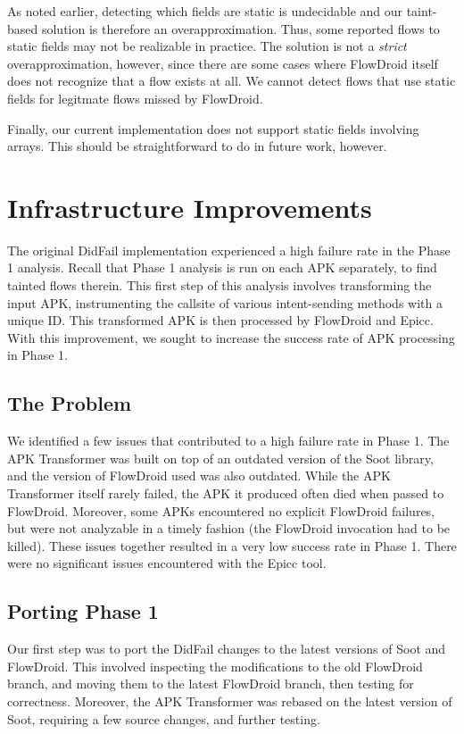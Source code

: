 As noted earlier, detecting which fields are static is undecidable and our taint-based solution is therefore an overapproximation. Thus, some reported flows to static fields may not be realizable in practice. The solution is not a \emph{strict} overapproximation, however, since there are some cases where FlowDroid itself does not recognize that a flow exists at all. We cannot detect flows that use static fields for legitmate flows missed by FlowDroid. 

Finally, our current implementation does not support static fields involving arrays. This should be straightforward to do in future work, however.


\chapter{Infrastructure Improvements}
\label{sec:infrastructure}
The original DidFail implementation experienced a high failure rate in the Phase 1 analysis.  Recall that Phase 1 analysis is run on each APK separately, to find tainted flows therein.  This first step of this analysis involves transforming the input APK, instrumenting the callsite of various intent-sending methods with a unique ID.  This transformed APK is then processed by FlowDroid and Epicc.  With this improvement, we sought to increase the success rate of APK processing in Phase 1.

\section{The Problem}
We identified a few issues that contributed to a high failure rate in Phase 1.  The APK Transformer was built on top of an outdated version of the Soot library, and the version of FlowDroid used was also outdated.  While the APK Transformer itself rarely failed, the APK it produced often died when passed to FlowDroid.  Moreover, some APKs encountered no explicit FlowDroid failures, but were not analyzable in a timely fashion (the FlowDroid invocation had to be killed).   These issues together resulted in a very low success rate in Phase 1.  There were no significant issues encountered with the Epicc tool.

\section{Porting Phase 1}
Our first step was to port the DidFail changes to the latest versions of Soot and FlowDroid.  This involved inspecting the modifications to the old FlowDroid branch, and moving them to the latest FlowDroid branch, then testing for correctness.  Moreover, the APK Transformer was rebased on the latest version of Soot, requiring a few source changes, and further testing.

